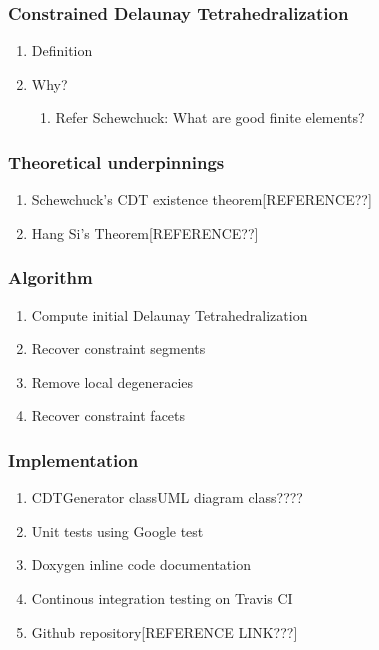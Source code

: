 \documentclass{beamer}
\begin{document}
	\begin{frame}
		\frametitle{Constrained Delaunay Tetrahedralization}
			\begin{enumerate}
				\item Definition		
				\item Why?
					\begin{enumerate}
						\item Refer Schewchuck: What are good finite elements?		
					\end{enumerate}		
			\end{enumerate}		
	\end{frame}	
	\begin{frame}
		\frametitle{Theoretical underpinnings}
			\begin{enumerate}
				\item	Schewchuck's CDT existence theorem[REFERENCE??]
				\item	Hang Si's Theorem[REFERENCE??]
			\end{enumerate}		
	\end{frame}	
	\begin{frame}
		\frametitle{Algorithm} 
			\begin{enumerate}
				\item Compute initial Delaunay Tetrahedralization	
				\item Recover constraint segments
				\item Remove local degeneracies
				\item Recover constraint facets
			\end{enumerate}		
	\end{frame}
	\begin{frame}
		\frametitle{Implementation}
			\begin{enumerate}
				\item CDTGenerator class{UML diagram class????}
				\item Unit tests using Google test
				\item Doxygen inline code documentation
				\item Continous integration testing on Travis CI	
				\item Github repository[REFERENCE LINK???]	
			\end{enumerate}
	\end{frame}	
\end{document}
